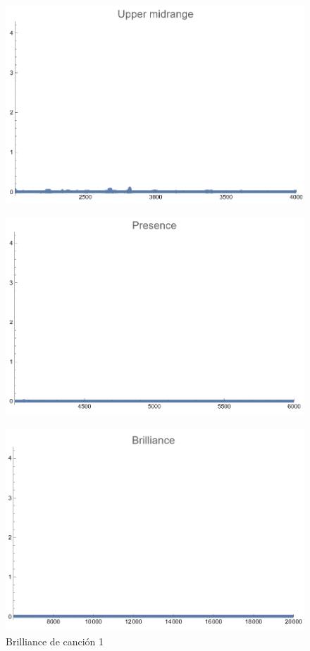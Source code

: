 \documentclass[12pt, letterpaper]{article}
\begin{document}
\begin{figure}[H]
  \centering
  \begin{minipage}{.5\textwidth}
    \centering
    \includegraphics[width=.9\linewidth]{imgs/Cancion1/upmid.png}
    \label{fig:01f}
  \end{minipage}%
  \begin{minipage}{.5\textwidth}
    \centering
    \includegraphics[width=.9\linewidth]{imgs/Cancion1/presence.png}
    \label{fig:01g}
  \end{minipage}
\end{figure}
\begin{figure}[H]
  \centering
  \includegraphics[width=.45\linewidth]{imgs/Cancion1/brilliance.png}
  \caption{Brilliance de canción 1}
  \label{fig:01h}
\end{figure}
\end{document}
